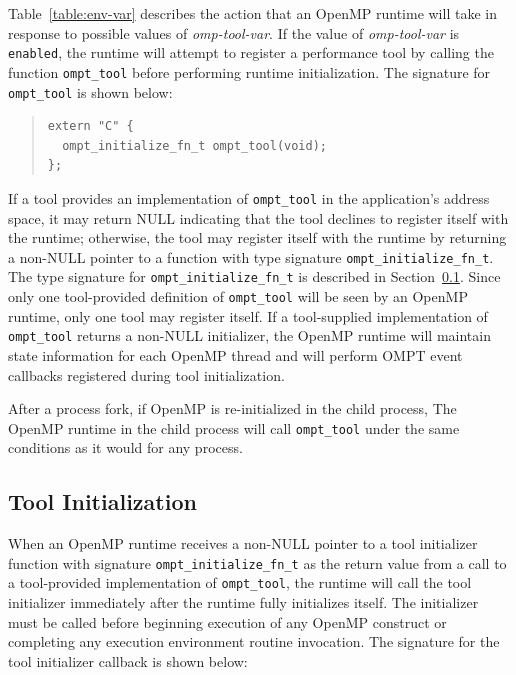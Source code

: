 \documentclass{article}
\begin{document}
\sloppy
Table~\ref{table:env-var} describes the action that an OpenMP runtime will take in response to possible values of {\em omp-tool-var}.
If the value of {\em omp-tool-var}  is  \verb|enabled|, the runtime will attempt to register  a performance tool by calling the function \verb|ompt_tool| before performing  runtime initialization. The signature for  \verb|ompt_tool|  is shown below:
\begin{quote}
\begin{verbatim}
extern "C" {
  ompt_initialize_fn_t ompt_tool(void);
};
\end{verbatim}
\end{quote}
 If a tool provides an implementation of \verb|ompt_tool| in the application's address space, it may return NULL indicating that the tool declines to register itself with the runtime; otherwise, the tool  may register itself with the runtime by returning a non-NULL pointer to a function with type signature \verb|ompt_initialize_fn_t|. The type signature for \verb|ompt_initialize_fn_t| is described in Section~\ref{sec:init}. 
Since only one tool-provided definition of \verb|ompt_tool| will be seen by an OpenMP runtime, only one tool may register itself. 
If a tool-supplied implementation of \verb|ompt_tool| returns a non-NULL initializer, the OpenMP runtime will maintain state information for each OpenMP thread and will perform OMPT event callbacks registered during tool initialization. 

After a process fork, if OpenMP is re-initialized in the child process,
The OpenMP runtime in the child process will call  \verb|ompt_tool| under the same conditions as it would for any process. 

\subsection{Tool Initialization}
\label{sec:init}

When an OpenMP runtime receives a non-NULL pointer to a tool initializer function with signature \verb|ompt_initialize_fn_t| as the return value from a call to a tool-provided implementation of \verb|ompt_tool|, the runtime will call the tool initializer immediately after the runtime fully initializes itself. The initializer must be called before beginning execution of any OpenMP construct or completing any execution environment  routine invocation.  The signature for the tool initializer callback is shown below:
\end{document}
